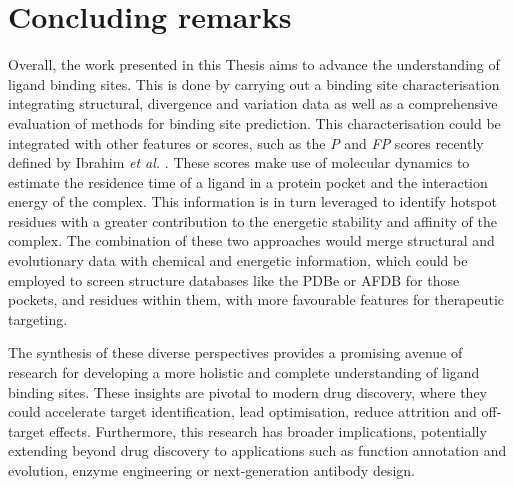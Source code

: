 \section{Concluding remarks}

Overall, the work presented in this Thesis aims to advance the understanding of ligand binding sites. This is done by carrying out a binding site characterisation integrating structural, divergence and variation data as well as a comprehensive evaluation of methods for binding site prediction. This characterisation could be integrated with other features or scores, such as the \textit{P} and \textit{FP} scores recently defined by Ibrahim \textit{et al.} \cite{IBRAHIM_2024_PSCORE, IBRAHIM_2024_FMOPHORE}. These scores make use of molecular dynamics to estimate the residence time of a ligand in a protein pocket and the interaction energy of the complex. This information is in turn leveraged to identify hotspot residues with a greater contribution to the energetic stability and affinity of the complex. The combination of these two approaches would merge structural and evolutionary data with chemical and energetic information, which could be employed to screen structure databases like the PDBe or AFDB for those pockets, and residues within them, with more favourable features for therapeutic targeting.

The synthesis of these diverse perspectives provides a promising avenue of research for developing a more holistic and complete understanding of ligand binding sites. These insights are pivotal to modern drug discovery, where they could accelerate target identification, lead optimisation, reduce attrition and off-target effects. Furthermore, this research has broader implications, potentially extending beyond drug discovery to applications such as function annotation and evolution, enzyme engineering or next-generation antibody design.
